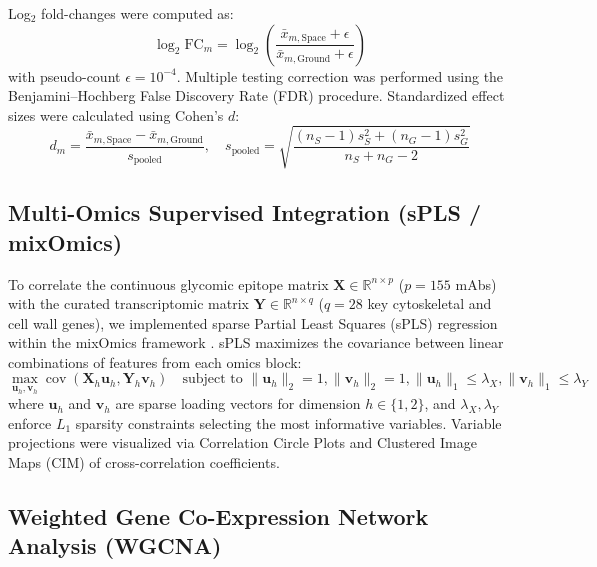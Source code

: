 Log$_2$ fold-changes were computed as:
\begin{equation}
    \log_2\text{FC}_m = \log_2\left( \frac{\bar{x}_{m,\text{Space}} + \epsilon}{\bar{x}_{m,\text{Ground}} + \epsilon} \right)
\end{equation}
with pseudo-count $\epsilon = 10^{-4}$. Multiple testing correction was performed using the Benjamini--Hochberg False Discovery Rate (FDR) procedure. Standardized effect sizes were calculated using Cohen's $d$:
\begin{equation}
    d_m = \frac{\bar{x}_{m,\text{Space}} - \bar{x}_{m,\text{Ground}}}{s_{\text{pooled}}}, \quad s_{\text{pooled}} = \sqrt{\frac{(n_S - 1)s_S^2 + (n_G - 1)s_G^2}{n_S + n_G - 2}}
\end{equation}

\subsection{Multi-Omics Supervised Integration (sPLS / mixOmics)}

To correlate the continuous glycomic epitope matrix $\mathbf{X} \in \mathbb{R}^{n \times p}$ ($p = 155$ mAbs) with the curated transcriptomic matrix $\mathbf{Y} \in \mathbb{R}^{n \times q}$ ($q = 28$ key cytoskeletal and cell wall genes), we implemented sparse Partial Least Squares (sPLS) regression within the mixOmics framework \cite{Rohart2017}. sPLS maximizes the covariance between linear combinations of features from each omics block:
\begin{equation}
    \max_{\mathbf{u}_h, \mathbf{v}_h} \operatorname{cov}(\mathbf{X}_h \mathbf{u}_h, \mathbf{Y}_h \mathbf{v}_h) \quad \text{subject to } \|\mathbf{u}_h\|_2 = 1, \|\mathbf{v}_h\|_2 = 1, \|\mathbf{u}_h\|_1 \le \lambda_X, \|\mathbf{v}_h\|_1 \le \lambda_Y
\end{equation}
where $\mathbf{u}_h$ and $\mathbf{v}_h$ are sparse loading vectors for dimension $h \in \{1, 2\}$, and $\lambda_X, \lambda_Y$ enforce $L_1$ sparsity constraints selecting the most informative variables. Variable projections were visualized via Correlation Circle Plots and Clustered Image Maps (CIM) of cross-correlation coefficients.

\subsection{Weighted Gene Co-Expression Network Analysis (WGCNA)}

